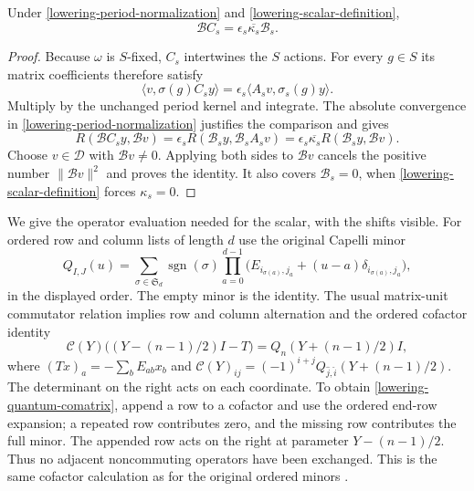 \begin{lemma}\label{lowering-normalized-adjoint}
Under \eqref{lowering-period-normalization} and
\eqref{lowering-scalar-definition},
\[
                \mathcal B C_s=\epsilon_s\overline{\kappa_s}
                                                    \mathcal B_s.
\]
\end{lemma}
\begin{proof}
Because $\omega$ is $S$-fixed, $C_s$ intertwines the $S$ actions.
For every $g\in S$ its matrix coefficients therefore satisfy
\[
        \langle v,\sigma(g)C_sy\rangle
                   =\epsilon_s\langle A_sv,\sigma_s(g)y\rangle.
\]
Multiply by the unchanged period kernel and integrate.  The absolute
convergence in \eqref{lowering-period-normalization} justifies the
comparison and gives
\[
 R(\mathcal B C_sy,\mathcal B v)
       =\epsilon_s R(\mathcal B_s y,\mathcal B_sA_sv)
       =\epsilon_s\overline{\kappa_s}
                           R(\mathcal B_s y,\mathcal B v).
\]
Choose $v\in\mathcal D$ with $\mathcal B v\ne0$.  Applying both
sides to $\mathcal B v$ cancels the positive number
$\|\mathcal B v\|^2$ and proves the identity.  It also covers
$\mathcal B_s=0$, when \eqref{lowering-scalar-definition} forces
$\kappa_s=0$.
\end{proof}

We give the operator evaluation needed for the scalar, with the shifts
visible.  For ordered row and column lists of length $d$ use the
original Capelli minor
\[
 Q_{I,J}(u)=\sum_{\sigma\in\mathfrak S_d}\operatorname{sgn}(\sigma)
       \prod_{a=0}^{d-1}
       \bigl(E_{i_{\sigma(a)},j_a}+(u-a)\delta_{i_{\sigma(a)},j_a}\bigr),
\]
in the displayed order.  The empty minor is the identity.  The usual
matrix-unit commutator relation implies row and column alternation and
the ordered cofactor identity
\begin{equation}\label{lowering-quantum-comatrix}
 \mathcal C(Y)\bigl((Y-(n-1)/2)I-T\bigr)
             =Q_n(Y+(n-1)/2)I,
\end{equation}
where $(Tx)_a=-\sum_bE_{ab}x_b$ and
$\mathcal C(Y)_{ij}=(-1)^{i+j}Q_{\widehat j,\widehat i}(Y+(n-1)/2)$.
The determinant on the right acts on each coordinate.  To obtain
\eqref{lowering-quantum-comatrix}, append a row to a cofactor and use
the ordered end-row expansion; a repeated row contributes zero, and
the missing row contributes the full minor.  The appended row acts
on the right at parameter $Y-(n-1)/2$.  Thus no adjacent noncommuting
operators have been exchanged.  This is the same cofactor calculation
as for the original ordered minors
\cite{normalized-lowering-prior-minors}.

